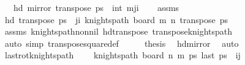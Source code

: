 \begin{isabellebody}
\ \ \ {\isachardoublequoteopen}hd\ {\isacharparenleft}{\kern0pt}mirror{}\ {\isacharparenleft}{\kern0pt}transpose\ ps{\isacharparenright}{\kern0pt}{\isacharparenright}{\kern0pt}\ {\isacharequal}{\kern0pt}\ {\isacharparenleft}{\kern0pt}int\ m{\isacharplus}{\kern0pt}{}{\isacharminus}{\kern0pt}j{\isacharcomma}{\kern0pt}i{\isacharparenright}{\kern0pt}{\isachardoublequoteclose}\isanewline
%
\isadelimproof
\ \ %
\endisadelimproof
%
\isatagproof
{}\isamarkupfalse%
\ assms\isanewline
{}\isamarkupfalse%
\ {\isacharminus}{\kern0pt}\isanewline
\ \ \isamarkupfalse%
\ {\isachardoublequoteopen}hd\ {\isacharparenleft}{\kern0pt}transpose\ ps{\isacharparenright}{\kern0pt}\ {\isacharequal}{\kern0pt}\ {\isacharparenleft}{\kern0pt}j{\isacharcomma}{\kern0pt}i{\isacharparenright}{\kern0pt}{\isachardoublequoteclose}\ {\isachardoublequoteopen}knights{\isacharunderscore}{\kern0pt}path\ {\isacharparenleft}{\kern0pt}board\ m\ n{\isacharparenright}{\kern0pt}\ {\isacharparenleft}{\kern0pt}transpose\ ps{\isacharparenright}{\kern0pt}{\isachardoublequoteclose}\isanewline
\ \ \ \ \isamarkupfalse%
\ assms\ knights{\isacharunderscore}{\kern0pt}path{\isacharunderscore}{\kern0pt}non{\isacharunderscore}{\kern0pt}nil\ hd{\isacharunderscore}{\kern0pt}transpose\ transpose{\isacharunderscore}{\kern0pt}knights{\isacharunderscore}{\kern0pt}path\ \isanewline
\ \ \ \ \isamarkupfalse%
\ {\isacharparenleft}{\kern0pt}auto\ simp{\isacharcolon}{\kern0pt}\ transpose{\isacharunderscore}{\kern0pt}square{\isacharunderscore}{\kern0pt}def{\isacharparenright}{\kern0pt}\isanewline
\ \ \isamarkupfalse%
\ \isamarkupfalse%
\ {\isacharquery}{\kern0pt}thesis\ \isamarkupfalse%
\ hd{\isacharunderscore}{\kern0pt}mirror{}\ \isamarkupfalse%
\ auto\isanewline
{}\isamarkupfalse%
%
\endisatagproof
{\isafoldproof}%
%
\isadelimproof
\isanewline
%
\endisadelimproof
\isanewline
{}\isamarkupfalse%
\ last{\isacharunderscore}{\kern0pt}rot{}{}{\isacharunderscore}{\kern0pt}knights{\isacharunderscore}{\kern0pt}path{\isacharcolon}{\kern0pt}\ \isanewline
\ \ \ {\isachardoublequoteopen}knights{\isacharunderscore}{\kern0pt}path\ {\isacharparenleft}{\kern0pt}board\ n\ m{\isacharparenright}{\kern0pt}\ ps{\isachardoublequoteclose}\ {\isachardoublequoteopen}last\ ps\ {\isacharequal}{\kern0pt}\ {\isacharparenleft}{\kern0pt}i{\isacharcomma}{\kern0pt}j{\isacharparenright}{\kern0pt}{\isachardoublequoteclose}\isanewline

\end{isabellebody}
